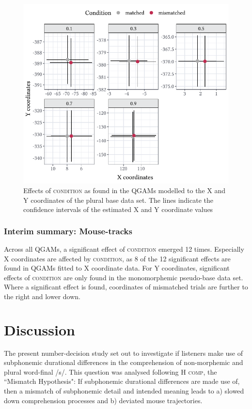 \begin{figure}
    \centering
    \includegraphics[]{figures/fig7.11.pdf}
    \caption{Effects of \textsc{condition} as found in the QGAMs modelled to the X and Y coordinates of the plural base data set. The lines indicate the confidence intervals of the estimated X and Y coordinate values}
    \label{fig:7_11}
\end{figure}

\subsubsection{Interim summary: Mouse-tracks}\label{section07_2_3_3}

Across all QGAMs, a significant effect of \textsc{condition} emerged 12 times. Especially X coordinates are affected by \textsc{condition}, as 8 of the 12 significant effects are found in QGAMs fitted to X coordinate data. For Y coordinates, significant effects of \textsc{condition} are only found in the monomorphemic pseudo-base data set. Where a significant effect is found, coordinates of mismatched trials are further to the right and lower down.

\section{Discussion}\label{section07_3}

The present number-decision study set out to investigate if listeners make use of subphonemic durational differences in the comprehension of non-morphemic and plural word-final /s/. This question was analysed following \textsc{H comp}, the ``Mismatch Hypothesis": If subphonemic durational differences are made use of, then a mismatch of subphonemic detail and intended meaning leads to a) slowed down comprehension processes and b) deviated mouse trajectories.

